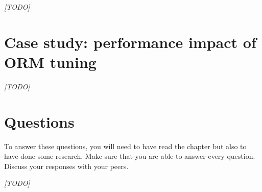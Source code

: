\emph{[TODO]}

\section{Case study: performance impact of ORM tuning}

\emph{[TODO]}


\section{Questions}

To answer these questions, you will need to have read the chapter but also to have done some research. Make sure that you are able to answer every question. Discuss your responses with your peers.

\emph{[TODO]}



